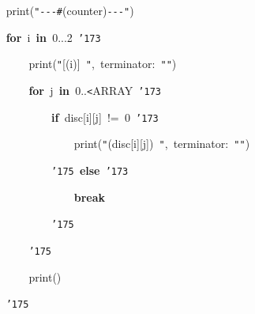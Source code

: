 \documentclass[a4paper,10pt]{article}
\def\mc{\relax}
\begin{document}
\noindent
\mbox{}{\tt\mc \ }{\tt\mc \ }{\tt\mc \ }{\tt\mc \ }print({\tt "}{\tt -}{\tt -}{\tt -}{\tt\#}{\tt{}}(counter){\tt -}{\tt -}{\tt -}{\tt "})

\noindent
\mbox{}{\tt\mc \ }{\tt\mc \ }{\tt\mc \ }{\tt\mc \ }\textbf{for}{\tt\mc \ }i{\tt\mc \ }\textbf{in}{\tt\mc \ }0...2{\tt\mc \ }{\tt\char'173}

\noindent
\mbox{}{\tt\mc \ }{\tt\mc \ }{\tt\mc \ }{\tt\mc \ }{\tt\mc \ }{\tt\mc \ }{\tt\mc \ }{\tt\mc \ }print({\tt "}[{\tt{}}(i)]{\tt\mc \ }{\tt "},{\tt\mc \ }terminator:{\tt\mc \ }{\tt "}{\tt "})

\noindent
\mbox{}{\tt\mc \ }{\tt\mc \ }{\tt\mc \ }{\tt\mc \ }{\tt\mc \ }{\tt\mc \ }{\tt\mc \ }{\tt\mc \ }\textbf{for}{\tt\mc \ }j{\tt\mc \ }\textbf{in}{\tt\mc \ }0..{\tt <}ARRAY{\tt\mc \ }{\tt\char'173}

\noindent
\mbox{}{\tt\mc \ }{\tt\mc \ }{\tt\mc \ }{\tt\mc \ }{\tt\mc \ }{\tt\mc \ }{\tt\mc \ }{\tt\mc \ }{\tt\mc \ }{\tt\mc \ }{\tt\mc \ }{\tt\mc \ }\textbf{if}{\tt\mc \ }disc[i][j]{\tt\mc \ }!={\tt\mc \ }0{\tt\mc \ }{\tt\char'173}

\noindent
\mbox{}{\tt\mc \ }{\tt\mc \ }{\tt\mc \ }{\tt\mc \ }{\tt\mc \ }{\tt\mc \ }{\tt\mc \ }{\tt\mc \ }{\tt\mc \ }{\tt\mc \ }{\tt\mc \ }{\tt\mc \ }{\tt\mc \ }{\tt\mc \ }{\tt\mc \ }{\tt\mc \ }print({\tt "}{\tt{}}(disc[i][j]){\tt\mc \ }{\tt "},{\tt\mc \ }terminator:{\tt\mc \ }{\tt "}{\tt "})

\noindent
\mbox{}{\tt\mc \ }{\tt\mc \ }{\tt\mc \ }{\tt\mc \ }{\tt\mc \ }{\tt\mc \ }{\tt\mc \ }{\tt\mc \ }{\tt\mc \ }{\tt\mc \ }{\tt\mc \ }{\tt\mc \ }{\tt\char'175}{\tt\mc \ }\textbf{else}{\tt\mc \ }{\tt\char'173}

\noindent
\mbox{}{\tt\mc \ }{\tt\mc \ }{\tt\mc \ }{\tt\mc \ }{\tt\mc \ }{\tt\mc \ }{\tt\mc \ }{\tt\mc \ }{\tt\mc \ }{\tt\mc \ }{\tt\mc \ }{\tt\mc \ }{\tt\mc \ }{\tt\mc \ }{\tt\mc \ }{\tt\mc \ }\textbf{break}

\noindent
\mbox{}{\tt\mc \ }{\tt\mc \ }{\tt\mc \ }{\tt\mc \ }{\tt\mc \ }{\tt\mc \ }{\tt\mc \ }{\tt\mc \ }{\tt\mc \ }{\tt\mc \ }{\tt\mc \ }{\tt\mc \ }{\tt\char'175}

\noindent
\mbox{}{\tt\mc \ }{\tt\mc \ }{\tt\mc \ }{\tt\mc \ }{\tt\mc \ }{\tt\mc \ }{\tt\mc \ }{\tt\mc \ }{\tt\char'175}

\noindent
\mbox{}{\tt\mc \ }{\tt\mc \ }{\tt\mc \ }{\tt\mc \ }{\tt\mc \ }{\tt\mc \ }{\tt\mc \ }{\tt\mc \ }print()

\noindent
\mbox{}{\tt\mc \ }{\tt\mc \ }{\tt\mc \ }{\tt\mc \ }{\tt\char'175}
\end{document}
